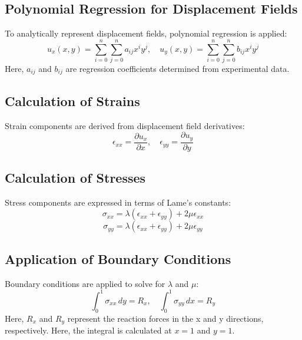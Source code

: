 \documentclass[fleqn,10pt]{olplainarticle}
\begin{document}
\subsection{Polynomial Regression for Displacement Fields}
To analytically represent displacement fields, polynomial regression is applied:
\[
u_x(x, y) = \sum_{i=0}^{n} \sum_{j=0}^{n} a_{ij} x^i y^j, \quad 
u_y(x, y) = \sum_{i=0}^{n} \sum_{j=0}^{n} b_{ij} x^i y^j
\]
Here, \( a_{ij} \) and \( b_{ij} \) are regression coefficients determined from experimental data.

\subsection{Calculation of Strains}
Strain components are derived from displacement field derivatives:
\[
\epsilon_{xx} = \frac{\partial u_x}{\partial x}, \quad 
\epsilon_{yy} = \frac{\partial u_y}{\partial y}
\]

\subsection{Calculation of Stresses}
Stress components are expressed in terms of Lame's constants:
\[
\sigma_{xx} = \lambda (\epsilon_{xx} + \epsilon_{yy}) + 2\mu \epsilon_{xx}
\]
\[
\sigma_{yy} = \lambda (\epsilon_{xx} + \epsilon_{yy}) + 2\mu \epsilon_{yy}
\]

\subsection{Application of Boundary Conditions}
Boundary conditions are applied to solve for \( \lambda \) and \( \mu \):
\[
\int_0^1 \sigma_{xx} \, dy = R_x, \quad 
\int_0^1 \sigma_{yy} \, dx = R_y
\]
Here, \( R_x \) and \( R_y \) represent the reaction forces in the x and y directions, respectively. Here, the integral is calculated at \(x=1\) and \(y=1\).
\end{document}
